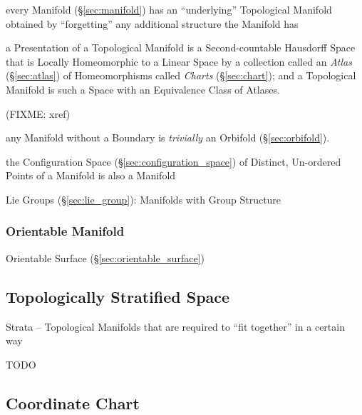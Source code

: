 every Manifold (\S\ref{sec:manifold}) has an ``underlying'' Topological Manifold
obtained by ``forgetting'' any additional structure the Manifold has


a Presentation of a Topological Manifold is a Second-countable Hausdorff Space
that is Locally Homeomorphic to a Linear Space by a collection called an
\emph{Atlas} (\S\ref{sec:atlas}) of Homeomorphisms called \emph{Charts}
(\S\ref{sec:chart}); and a Topological Manifold is such a Space with an
Equivalence Class of Atlases.

(FIXME: xref)

\fist any Manifold without a Boundary is \emph{trivially} an Orbifold
(\S\ref{sec:orbifold}).

the Configuration Space (\S\ref{sec:configuration_space}) of Distinct,
Un-ordered Points of a Manifold is also a Manifold

\fist Lie Groups (\S\ref{sec:lie_group}): Manifolds with Group Structure



\subsubsection{Orientable Manifold}\label{sec:orientable_manifold}

\fist Orientable Surface (\S\ref{sec:orientable_surface})



\subsection{Topologically Stratified Space}\label{sec:topologically_stratified}

Strata -- Topological Manifolds that are required to ``fit together'' in a
certain way

TODO



\subsection{Coordinate Chart}\label{sec:coordinate_chart}

